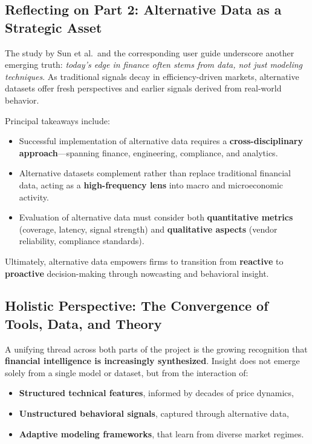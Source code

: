\subsection{Reflecting on Part 2: Alternative Data as a Strategic Asset}

The study by Sun et al.\ and the corresponding user guide underscore another emerging truth: \textit{today's edge in finance often stems from data, not just modeling techniques}. As traditional signals decay in efficiency-driven markets, alternative datasets offer fresh perspectives and earlier signals derived from real-world behavior.

Principal takeaways include:

\begin{itemize}
    \item Successful implementation of alternative data requires a \textbf{cross-disciplinary approach}—spanning finance, engineering, compliance, and analytics.
    \item Alternative datasets complement rather than replace traditional financial data, acting as a \textbf{high-frequency lens} into macro and microeconomic activity.
    \item Evaluation of alternative data must consider both \textbf{quantitative metrics} (coverage, latency, signal strength) and \textbf{qualitative aspects} (vendor reliability, compliance standards).
\end{itemize}

Ultimately, alternative data empowers firms to transition from \textbf{reactive} to \textbf{proactive} decision-making through nowcasting and behavioral insight.

\subsection{Holistic Perspective: The Convergence of Tools, Data, and Theory}

A unifying thread across both parts of the project is the growing recognition that \textbf{financial intelligence is increasingly synthesized}. Insight does not emerge solely from a single model or dataset, but from the interaction of:

\begin{itemize}
    \item \textbf{Structured technical features}, informed by decades of price dynamics,
    \item \textbf{Unstructured behavioral signals}, captured through alternative data,
    \item \textbf{Adaptive modeling frameworks}, that learn from diverse market regimes.
\end{itemize}

